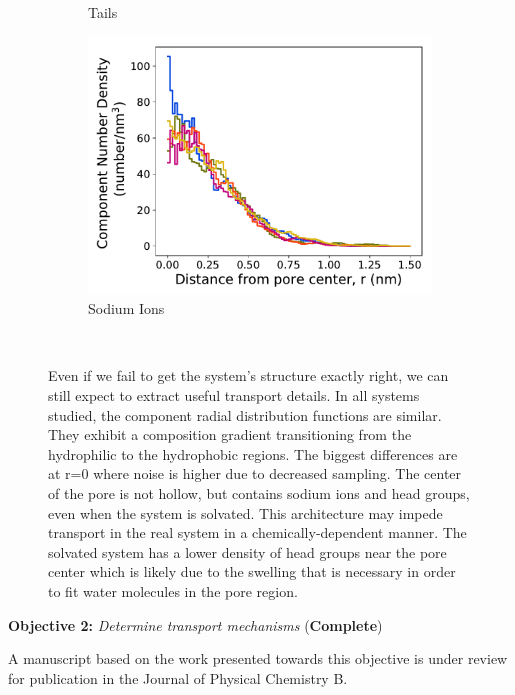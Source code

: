 \documentclass{article}
\begin{document}
\begin{figure}[!htb]
\begin{subfigure}{0.32\textwidth}
        \caption{Tails}
        \label{fig:tails_regional_density}
  \end{subfigure}
  \begin{subfigure}{0.32\textwidth}
        \includegraphics[width=1\linewidth]{sodium_density.pdf}
        \caption{Sodium Ions}
        \label{fig:sodium_regional_density}
  \end{subfigure}
  \caption{Even if we fail to get the system's structure exactly right, we can still 
  		   expect to extract useful transport details. In all systems studied, the 
  		   component radial distribution functions are similar. They exhibit a 
  		   composition gradient transitioning from the hydrophilic to the hydrophobic
           regions. The biggest differences are at r=0 where noise is higher due to
           decreased sampling. The center of the pore is not hollow, but contains sodium
           ions and head groups, even when the system is solvated. This architecture may
           impede transport in the real system in a chemically-dependent manner. The
           solvated system has a lower density of head groups near the pore center 
           which is likely due to the swelling that is necessary in order to fit water
           molecules in the pore region.}~\label{fig:overlaid_densities}
  \vspace{-0.5cm}
  \end{figure}
  
  \noindent \textbf{\large Objective 2:} \textit{\large Determine transport mechanisms} (\textcolor{green!40!olive}{\textbf{Complete}})
  
  \noindent A manuscript based on the work presented towards this objective is under 
  review for publication in the Journal of Physical Chemistry B.
\end{document}
